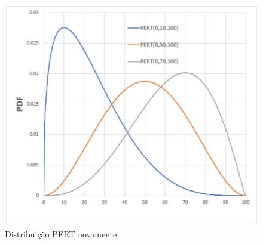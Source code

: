 \documentclass[12pt]{article}
\begin{document}
		\begin{figure}[h!]
	 		\centering
	 		\caption{Distribuição PERT novamente}
	 		\label{fig_pert2}
	 		\includegraphics[scale=0.2]{pert}
	 	\end{figure}
	 
	
	
	
\end{document}
